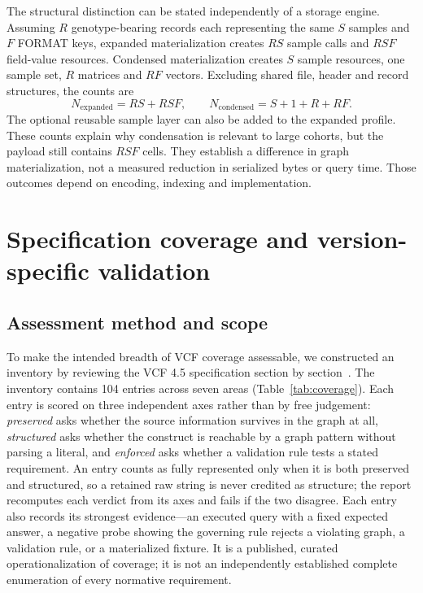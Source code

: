 \documentclass{ceurart}
\begin{document}
The structural distinction can be stated independently of a storage engine. Assuming $R$ genotype-bearing records each representing the same $S$ samples and $F$ FORMAT keys, expanded materialization creates $RS$ sample calls and $RSF$ field-value resources. Condensed materialization creates $S$ sample resources, one sample set, $R$ matrices and $RF$ vectors. Excluding shared file, header and record structures, the counts are
\[
N_{\mathrm{expanded}}=RS+RSF,\qquad
N_{\mathrm{condensed}}=S+1+R+RF.
\]
The optional reusable sample layer can also be added to the expanded profile. These counts explain why condensation is relevant to large cohorts, but the payload still contains $RSF$ cells. They establish a difference in graph materialization, not a measured reduction in serialized bytes or query time. Those outcomes depend on encoding, indexing and implementation.

\section{Specification coverage and version-specific validation}
\label{sec:coverage}

\subsection{Assessment method and scope}

To make the intended breadth of VCF coverage assessable, we constructed an inventory by reviewing the VCF 4.5 specification section by section~\cite{vcf45}. The inventory contains 104 entries across seven areas (Table~\ref{tab:coverage}). Each entry is scored on three independent axes rather than by free judgement: \emph{preserved} asks whether the source information survives in the graph at all, \emph{structured} asks whether the construct is reachable by a graph pattern without parsing a literal, and \emph{enforced} asks whether a validation rule tests a stated requirement. An entry counts as fully represented only when it is both preserved and structured, so a retained raw string is never credited as structure; the report recomputes each verdict from its axes and fails if the two disagree. Each entry also records its strongest evidence---an executed query with a fixed expected answer, a negative probe showing the governing rule rejects a violating graph, a validation rule, or a materialized fixture. It is a published, curated operationalization of coverage; it is not an independently established complete enumeration of every normative requirement.
\end{document}
